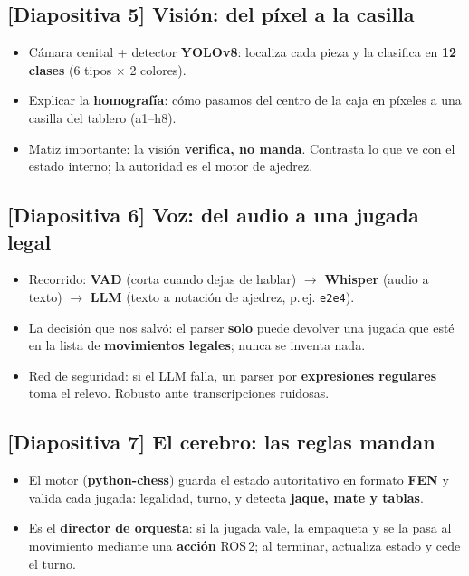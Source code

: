 \documentclass[11pt]{article}
\newcommand{\slide}[1]{\textbf{\color{azul}[Diapositiva #1]}}
\begin{document}
\subsection{\slide{5} Visión: del píxel a la casilla}
\begin{itemize}
    \item Cámara cenital + detector \textbf{YOLOv8}: localiza cada pieza y la
          clasifica en \textbf{12 clases} (6 tipos $\times$ 2 colores).
    \item Explicar la \textbf{homografía}: cómo pasamos del centro de la caja
          en píxeles a una casilla del tablero (a1--h8).
    \item Matiz importante: la visión \textbf{verifica, no manda}. Contrasta lo
          que ve con el estado interno; la autoridad es el motor de ajedrez.
\end{itemize}

\subsection{\slide{6} Voz: del audio a una jugada legal}
\begin{itemize}
    \item Recorrido: \textbf{VAD} (corta cuando dejas de hablar) $\rightarrow$
          \textbf{Whisper} (audio a texto) $\rightarrow$ \textbf{LLM} (texto a
          notación de ajedrez, p.\,ej. \texttt{e2e4}).
    \item La decisión que nos salvó: el parser \textbf{solo} puede devolver una
          jugada que esté en la lista de \textbf{movimientos legales}; nunca se
          inventa nada.
    \item Red de seguridad: si el LLM falla, un parser por \textbf{expresiones
          regulares} toma el relevo. Robusto ante transcripciones ruidosas.
\end{itemize}

\subsection{\slide{7} El cerebro: las reglas mandan}
\begin{itemize}
    \item El motor (\textbf{python-chess}) guarda el estado autoritativo en
          formato \textbf{FEN} y valida cada jugada: legalidad, turno, y detecta
          \textbf{jaque, mate y tablas}.
    \item Es el \textbf{director de orquesta}: si la jugada vale, la empaqueta y
          se la pasa al movimiento mediante una \textbf{acción} ROS\,2; al
          terminar, actualiza estado y cede el turno.
\end{itemize}
\end{document}
